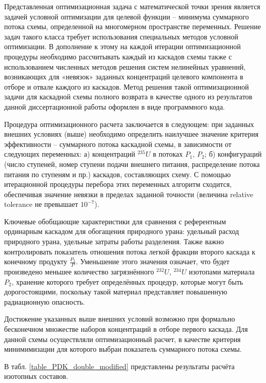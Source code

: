 Представленная оптимизационная задача с математической точки зрения является задачей условной оптимизации для целевой функции -- минимума суммарного потока схемы, определенной на многомерном пространстве переменных. Решение задач такого класса требует использования специальных методов условной оптимизации. В дополнение к этому на каждой итерации оптимизационной процедуры необходимо рассчитывать каждый из каскадов схемы также с использованием численных методов решения систем нелинейных уравнений, возникающих для «невязок» заданных концентраций целевого компонента в отборе и отвале каждого из каскадов. Метод решения такой оптимизационной задачи для каскадной схемы полного возврата в качестве одного из результатов данной диссертационной работы оформлен в виде программного кода. 

Процедура оптимизационного расчета заключается в следующем: при заданных внешних условиях (выше) необходимо определить наилучшее значение критерия эффективности – суммарного потока каскадной схемы, в зависимости от следующих переменных: а) концентраций $^{235}U$ в потоках $P_1$, $P_2$; б) конфигураций (число ступеней, номер ступени подачи внешнего питания, распределение потока питания по ступеням и пр.) каскадов, составляющих схему. С помощью итерационной процедуры перебора этих переменных алгоритм сходится, обеспечивая значение невязки в пределах заданной точности (величина relative tolerance не превышает $10^{-7}$).
 
Ключевые обобщающие характеристики для сравнения с референтным ординарным каскадом для обогащения природного урана: удельный расход природного урана, удельные затраты работы разделения. Также важно контролировать показатель отношения потока легкой фракции второго каскада к конечному продукту $\frac{P_2}{P}$. Уменьшение этого значения означает, что будет произведено меньшее количество загрязнённого $^{232}U$, $^{234}U$ изотопами материала $P_2$, хранение которого требует определённых процедур, которые могут быть дорогостоящими, поскольку такой материал представляет повышенную радиационную опасность.

Достижение указанных выше внешних условий возможно при формально бесконечном множестве наборов концентраций в отборе первого каскада. Для данной схемы осуществляли оптимизационный расчет, в качестве критерия минимимизации для которого выбран показатель суммарного потока схемы. 

В табл. \ref{table_PDK_double_modified} представлены результаты расчёта изотопных составов.

